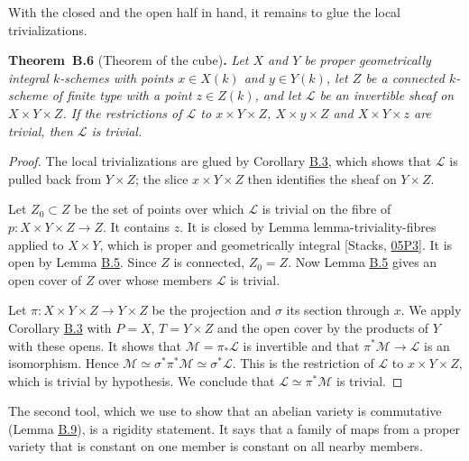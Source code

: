 \documentclass[11pt]{article}
\newenvironment{bpstatement}[2]{\par\addvspace{0.6\baselineskip}\noindent\textbf{#1}#2\textbf{.}\enspace\ignorespaces}
  {\par\addvspace{0.4\baselineskip}}
\newenvironment{bpstatementit}[2]{\begin{bpstatement}{#1}{#2}\itshape\ignorespaces}{\end{bpstatement}}
\begin{document}
\label{bp16}%
With the closed and the open half in hand, it remains to glue the local trivializations.

\label{bp17}%
\begin{bpstatementit}{Theorem~B.6}{ (Theorem of the cube)}
Let \(X\) and \(Y\) be proper geometrically integral \(k\)-schemes with points \(x\in X(k)\) and \(y\in Y(k)\), let \(Z\) be a connected \(k\)-scheme of finite type with a point \(z\in Z(k)\), and let \(\mathcal L\) be an invertible sheaf on \(X\times Y\times Z\). If the restrictions of \(\mathcal L\) to \(x\times Y\times Z\), \(X\times y\times Z\) and \(X\times Y\times z\) are trivial, then \(\mathcal L\) is trivial.
\end{bpstatementit}

\begin{proof}[{Proof}]\label{bp18}%
The local trivializations are glued by Corollary \hyperref[bp9]{B.3}, which shows that \(\mathcal L\) is pulled back from \(Y\times Z\); the slice \(x\times Y\times Z\) then identifies the sheaf on \(Y\times Z\).

Let \(Z_0\subset Z\) be the set of points over which \(\mathcal L\) is trivial on the fibre of \(p:X\times Y\times Z\to Z\). It contains \(z\). It is closed by Lemma lemma-triviality-fibres applied to \(X\times Y\), which is proper and geometrically integral [Stacks, \href{https://stacks.math.columbia.edu/tag/05P3}{05P3}]. It is open by Lemma \hyperref[bp14]{B.5}. Since \(Z\) is connected, \(Z_0=Z\). Now Lemma \hyperref[bp14]{B.5} gives an open cover of \(Z\) over whose members \(\mathcal L\) is trivial.

Let \(\pi:X\times Y\times Z\to Y\times Z\) be the projection and \(\sigma\) its section through \(x\). We apply Corollary \hyperref[bp9]{B.3} with \(P=X\), \(T=Y\times Z\) and the open cover by the products of \(Y\) with these opens. It shows that \(\mathcal M=\pi_*\mathcal L\) is invertible and that \(\pi^*\mathcal M\to\mathcal L\) is an isomorphism. Hence \(\mathcal M\simeq\sigma^*\pi^*\mathcal M\simeq\sigma^*\mathcal L\). This is the restriction of \(\mathcal L\) to \(x\times Y\times Z\), which is trivial by hypothesis. We conclude that \(\mathcal L\simeq\pi^*\mathcal M\) is trivial.
\end{proof}

\label{bp19}%
The second tool, which we use to show that an abelian variety is commutative (Lemma \hyperref[bp26]{B.9}), is a rigidity statement. It says that a family of maps from a proper variety that is constant on one member is constant on all nearby members.
\end{document}
